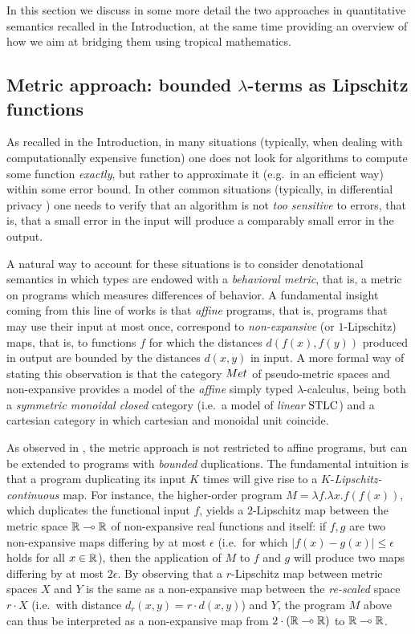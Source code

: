 

In this section we discuss in some more detail the two approaches in quantitative semantics recalled in the Introduction, at the same time providing an overview of how we aim at bridging them using tropical mathematics.

\subsection{Metric approach: bounded $\lambda$-terms as Lipschitz functions}


As recalled in the Introduction, in many situations (typically, when dealing with computationally expensive function) one does not look for algorithms to compute some function \emph{exactly}, but rather to approximate it (e.g.~in an efficient way) within some error bound. In other common situations (typically, in differential privacy \cite{}) one needs to verify that an algorithm is not \emph{too sensitive} to errors, that is, that a small error in the input will produce a comparably small error in the output. 

A natural way to account for these situations is to consider denotational semantics in which types are endowed with a \emph{behavioral metric}, that is, a metric on programs which measures differences of behavior. 
A fundamental insight coming from this line of works is that \emph{affine} programs, that is, programs that may use their input at most once, correspond to \emph{non-expansive} (or $1$-Lipschitz) maps, that is, to functions $f$ for which the distances
$d(f(x),f(y))$ produced in output are bounded by the distances $d(x,y)$ in input. 
A more formal way of stating this observation is that the category $\Met$ of pseudo-metric spaces and non-expansive provides a model of the \emph{affine} simply typed $\lambda$-calculus, being both a \emph{symmetric monoidal closed} category (i.e.~a model of \emph{linear} $\mathrm{STLC}$) and a cartesian category in which cartesian and monoidal unit coincide. 

As observed in \cite{Gabo2017}, the metric approach is not restricted to affine programs, but can be extended to programs with \emph{bounded} duplications. The fundamental intuition is that a program duplicating its input $K$ times will give rise to a $K$-\emph{Lipschitz-continuous} map.
For instance, the higher-order program $M=\lambda f.\lambda x.f(f(x))$, which duplicates the functional input $f$, yields a $2$-Lipschitz map between the metric space $\mathbb{R}\multimap \mathbb{R}$ of non-expansive real functions and itself: if $f,g$ are two non-expansive maps differing by at most $\epsilon$ (i.e.~for which $|f(x)-g(x)|\leq \epsilon$ holds for all $x\in \mathbb{R}$), then the application of $M$ to $f$ and $g$ will produce two maps differing by at most $2\epsilon$. 
By observing that a $r$-Lipschitz map between metric spaces $X$ and $Y$ is the same as a non-expansive map between the \emph{re-scaled} space $r\cdot X$ (i.e.~with distance $d_{r}(x,y)=r\cdot d(x,y)$) and $Y$, the program $M$ above 
can thus be interpreted as a non-expansive map from $2\cdot(\mathbb{R}\multimap \mathbb{R})$ to $\mathbb{R}\multimap \mathbb{R}$.

